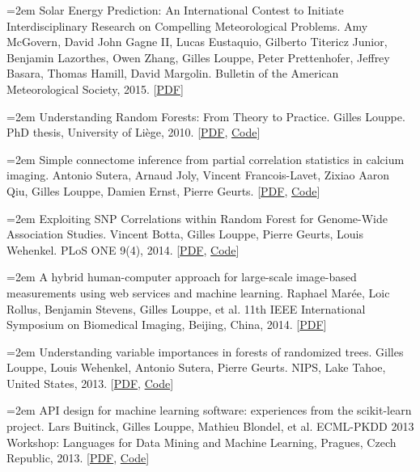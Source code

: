 \documentclass{scrartcl}
\newcommand{\MarginText}[1]{\marginpar{\raggedleft\itshape\small#1}}
\newcommand{\NewPublication}[4]{\noindent\hangindent=2em\hangafter=0 \MarginText{\color{black} #1}{\footnotesize [{\color{Maroon}#2}]} #3 {\footnotesize\color{gray}#4}\vspace{0.5em}}
\begin{document}
\begin{cv}{}
\NewPublication{}{11}{Solar Energy Prediction: An International Contest to Initiate Interdisciplinary Research on Compelling Meteorological Problems.}{%
Amy McGovern, David John Gagne II, Lucas Eustaquio, Gilberto Titericz Junior, Benjamin Lazorthes, Owen Zhang, Gilles Louppe, Peter Prettenhofer, Jeffrey Basara, Thomas Hamill, David Margolin.
Bulletin of the American Meteorological Society, 2015.
[\href{http://hdl.handle.net/2268/177115}{PDF}]}

\NewPublication{2014}{10}{Understanding Random Forests: From Theory to Practice.}{%
Gilles Louppe.
PhD thesis, University of Li{\`e}ge, 2010.
[\href{http://hdl.handle.net/2268/170309}{PDF}, \href{https://github.com/glouppe/phd-thesis}{Code}]}

\NewPublication{}{9}{Simple connectome inference from partial correlation statistics in calcium imaging.}{%
Antonio Sutera, Arnaud Joly, Vincent Francois-Lavet, Zixiao Aaron Qiu, Gilles Louppe, Damien Ernst, Pierre Geurts.
[\href{http://hdl.handle.net/2268/169767}{PDF}, \href{https://github.com/glouppe/kaggle-connectomics}{Code}]}

\NewPublication{}{8}{Exploiting SNP Correlations within Random Forest for Genome-Wide Association Studies.}{%
Vincent Botta, Gilles Louppe, Pierre Geurts, Louis Wehenkel.
PLoS ONE 9(4), 2014.
[\href{http://dx.plos.org/10.1371/journal.pone.0093379}{PDF}, \href{https://github.com/0asa/TTree-source}{Code}]}

\NewPublication{}{7}{A hybrid human-computer approach for large-scale image-based measurements using web services and machine learning.}{%
Raphael Mar{\'e}e, Loic Rollus, Benjamin Stevens, Gilles Louppe, et al.
11th IEEE International Symposium on Biomedical Imaging, Beijing, China, 2014.
[\href{http://hdl.handle.net/2268/162084}{PDF}]}

\NewPublication{2013}{6}{Understanding variable importances in forests of randomized trees.}{%
Gilles Louppe, Louis Wehenkel, Antonio Sutera, Pierre Geurts.
NIPS, Lake Tahoe, United States, 2013.
[\href{http://hdl.handle.net/2268/155642}{PDF}, \href{http://github.com/glouppe/paper-variable-importances}{Code}]}

\NewPublication{}{5}{API design for machine learning software: experiences from the scikit-learn project.}{%
Lars Buitinck, Gilles Louppe, Mathieu Blondel, et al.
ECML-PKDD 2013 Workshop: Languages for Data Mining and Machine Learning, Pragues, Czech Republic, 2013.
[\href{http://hdl.handle.net/2268/154357}{PDF}, \href{http://github.com/scikit-learn/scikit-learn}{Code}]}


\end{cv}
\end{document}
